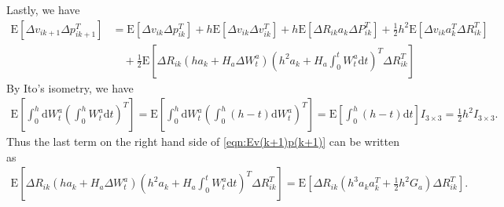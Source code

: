 \documentclass[10pt]{article}
\newcommand{\expect}[1]{\ensuremath{\mathrm{E}\left[ #1 \right]}}
\newcommand{\diff}[1]{\ensuremath{\mathrm{d} #1}}
\begin{document}
Lastly, we have
\color{blue}
\begin{align} \label{eqn:Ev(k+1)p(k+1)}
	\expect{\Delta v_{ik+1} \Delta p_{ik+1}^T} &= \expect{\Delta v_{ik} \Delta p_{ik}^T} + h\expect{\Delta v_{ik} \Delta v_{ik}^T} + h\expect{\Delta R_{ik}a_k\Delta P_{ik}^T} + \tfrac{1}{2}h^2\expect{\Delta v_{ik}a_k^T\Delta R_{ik}^T} \nonumber \\
	&\quad + \tfrac{1}{2} \expect{\Delta R_{ik}(ha_k + H_a\Delta W_t^a) \left(h^2a_k + H_a\int_0^t W_t^a\diff{t}\right)^T \Delta R_{ik}^T}
\end{align}
\color{black}
By Ito's isometry, we have
\begin{align*}
	\expect{\int_0^h \diff{W_t^a} \left( \int_0^h W_t^a \diff{t} \right)^T} = \expect{\int_0^h \diff{W_t^a} \left( \int_0^h (h-t) \diff{W_t^a} \right)^T} 
	=\expect{\int_0^h (h-t) \diff{t}} I_{3\times 3} = \tfrac{1}{2}h^2I_{3\times 3}.
\end{align*}
Thus the last term on the right hand side of \eqref{eqn:Ev(k+1)p(k+1)} can be written as
\begin{align}
	\expect{\Delta R_{ik}(ha_k + H_a\Delta W_t^a) \left(h^2a_k + H_a\int_0^t W_t^a\diff{t}\right)^T \Delta R_{ik}^T} = \expect{\Delta R_{ik} \left(h^3a_ka_k^T + \tfrac{1}{2}h^2G_a\right) \Delta R_{ik}^T}.
\end{align}
\end{document}
